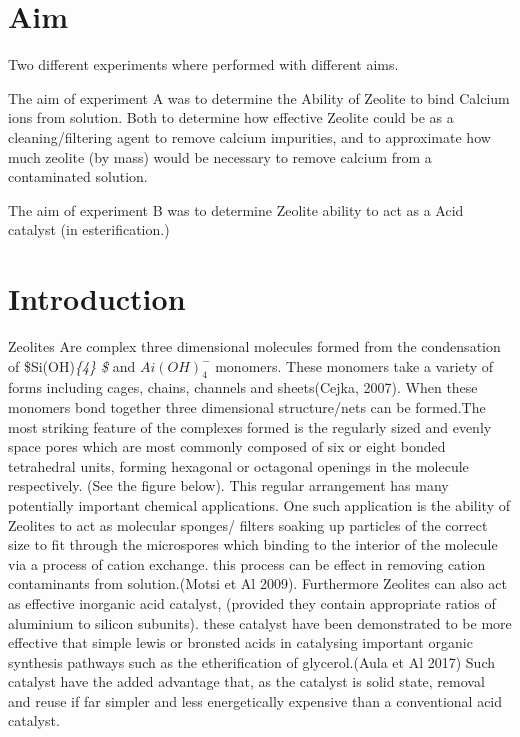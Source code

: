 \documentclass[]{article}
\begin{document}
\hypertarget{aim}{%
\section{Aim}\label{aim}}

Two different experiments where performed with different aims.

The aim of experiment A was to determine the Ability of Zeolite to bind
Calcium ions from solution. Both to determine how effective Zeolite
could be as a cleaning/filtering agent to remove calcium impurities, and
to approximate how much zeolite (by mass) would be necessary to remove
calcium from a contaminated solution.

The aim of experiment B was to determine Zeolite ability to act as a
Acid catalyst (in esterification.)

\hypertarget{introduction}{%
\section{Introduction}\label{introduction}}

Zeolites Are complex three dimensional molecules formed from the
condensation of \$Si(OH)\emph{\{4\} \$} and \(Ai(OH)^{-}_{4}\) monomers.
These monomers take a variety of forms including cages, chains, channels
and sheets(Cejka, 2007). When these monomers bond together three
dimensional structure/nets can be formed.The most striking feature of
the complexes formed is the regularly sized and evenly space pores which
are most commonly composed of six or eight bonded tetrahedral units,
forming hexagonal or octagonal openings in the molecule respectively.
(See the figure below). This regular arrangement has many potentially
important chemical applications. One such application is the ability of
Zeolites to act as molecular sponges/ filters soaking up particles of
the correct size to fit through the microspores which binding to the
interior of the molecule via a process of cation exchange. this process
can be effect in removing cation contaminants from solution.(Motsi et Al
2009). Furthermore Zeolites can also act as effective inorganic acid
catalyst, (provided they contain appropriate ratios of aluminium to
silicon subunits). these catalyst have been demonstrated to be more
effective that simple lewis or bronsted acids in catalysing important
organic synthesis pathways such as the etherification of glycerol.(Aula
et Al 2017) Such catalyst have the added advantage that, as the catalyst
is solid state, removal and reuse if far simpler and less energetically
expensive than a conventional acid catalyst.
\end{document}
